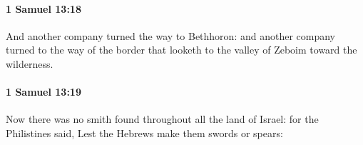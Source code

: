 		\paragraph{1 Samuel 13:18} %
			\label{1SAMUEL-13-18}

			And another company turned the way to Bethhoron: and another company turned to the way of the border that looketh to the valley of Zeboim toward the wilderness.


		\paragraph{1 Samuel 13:19} %
			\label{1SAMUEL-13-19}

			Now there was no smith found throughout all the land of Israel: for the Philistines said, Lest the Hebrews make them swords or spears:


